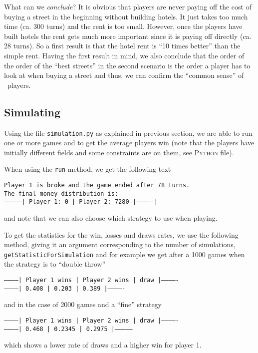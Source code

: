 What can we \emph{conclude}? 
It is obvious that players are never paying off the cost of buying a street in the beginning without 
building hotels. It just takes too much time (ca. 300 turns) and the rent is too small. However, once the 
players have built hotels the rent gets much more important since it is paying off directly (ca. 28 turns). 
So a first result is that the hotel rent is ``10 times better'' than the simple rent.
Having the first result in mind, we also conclude that the order of the order of the ``best streets'' in 
the second scenario is the order a player has to look at when buying a street and thus, we can confirm 
the ``common sense'' of \monopoly~players. 

\subsection{Simulating} %
\label{sub:simulating}
Using the file \texttt{simulation.py} as explained in previous section,
we are able to run one or more games and to get the average players win
(note that the players have initially different fields and some constraints
are on them, see \textsc{Python} file).

\vspace{1\baselineskip}

When using the \texttt{run} method, we get the following text
\begin{center}
  \texttt{Player 1 is broke and the game ended after 78 turns.\\
The final money distribution is:\\
---------------| Player 1: 0  | Player 2: 7280  |-------------|}
\end{center}
and note that we can also choose which strategy to use when playing.

\vspace{1\baselineskip}

To get the statistics for the win, losses and draws rates, we use the
following method, giving it an argument corresponding to the number
of simulations, \lstinline|getStatisticForSimulation| and for example
we get after a 1000 games when the strategy is to \enquote{double throw}
\begin{center}
  \texttt{------------| Player 1 wins | Player 2 wins | draw  |-------------\\
------------| 0.408         | 0.203         | 0.389 |-------------}
\end{center}
and in the case of 2000 games and a \enquote{fine} strategy
\begin{center}
  \texttt{------------| Player 1 wins | Player 2 wins | draw  |-------------\\
------------| 0.468         | 0.2345         | 0.2975 |--------------}
\end{center}
which shows a lower rate of draws and a higher win for player 1.

